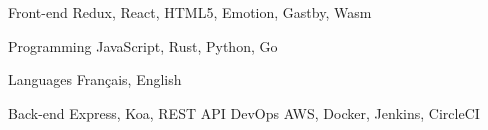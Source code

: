 

\begin{cvskills}

  \cvskill
    {Front-end} %
    {Redux, React, HTML5, Emotion, Gastby, Wasm} %

  \cvskill
    {Programming} %
    {JavaScript, Rust, Python, Go} %

  \cvskill
    {Languages} %
    {Français, English} %

\cvskill
  {Back-end} %
  {Express, Koa, REST API} %
\cvskill
  {DevOps} %
  {AWS, Docker, Jenkins, CircleCI} %

\end{cvskills}
